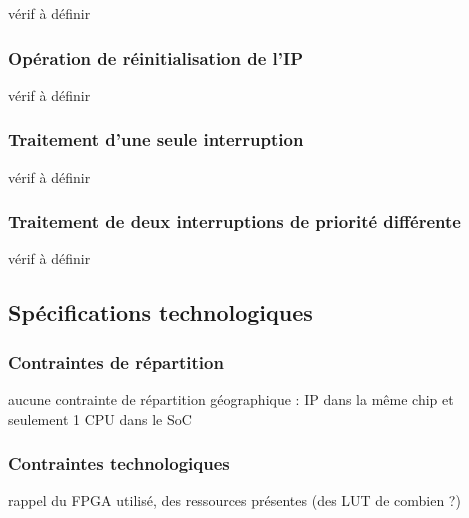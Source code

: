 vérif à définir

\subsubsection*{Opération de réinitialisation de l'IP}

vérif à définir

\subsubsection*{Traitement d'une seule interruption}

vérif à définir

\subsubsection*{Traitement de deux interruptions de priorité différente}

vérif à définir

\subsection{Spécifications technologiques}

\subsubsection{Contraintes de répartition}

aucune contrainte de répartition géographique : IP dans la même chip et seulement 1 CPU dans le SoC

\subsubsection{Contraintes technologiques}

rappel du FPGA utilisé, des ressources présentes (des LUT de combien ?)